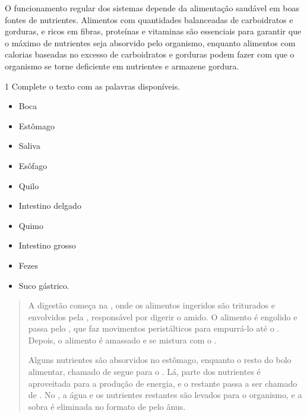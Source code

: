 {%

O funcionamento regular dos sistemas depende da alimentação saudável em
boas fontes de nutrientes. Alimentos com quantidades balanceadas de
carboidratos e gorduras, e ricos em fibras, proteínas e vitaminas são
essenciais para garantir que o máximo de nutrientes seja absorvido pelo
organismo, enquanto alimentos com calorias baseadas no excesso de
carboidratos e gorduras podem fazer com que o organismo se torne
deficiente em nutrientes e armazene gordura.}



\num{1} Complete o texto com as palavras disponíveis.

\begin{itemize}
\item Boca

\item Estômago

\item Saliva

\item Esôfago

\item Quilo

\item Intestino delgado

\item Quimo

\item Intestino grosso

\item Fezes

\item Suco gástrico.
\end{itemize}

\begin{quote}
A digestão começa na \preencher{}, onde os alimentos ingeridos são
triturados e envolvidos pela \preencher{}, responsável por digerir
o amido. O alimento é engolido e passa pelo \preencher{}, que faz
movimentos peristálticos para empurrá-lo até o \preencher{}.
Depois, o alimento é amassado e se mistura com o \preencher{}.

Alguns nutrientes são absorvidos no estômago, enquanto o resto do bolo
alimentar, chamado de \preencher{} segue para o \preencher{}. Lá, parte dos nutrientes é aproveitada para a produção de
energia, e o restante passa a ser chamado de \preencher{}. No \preencher{}, a água e os nutrientes restantes são levados para o
organismo, e a sobra é eliminada no formato de \preencher{} pelo
ânus.
\end{quote}

